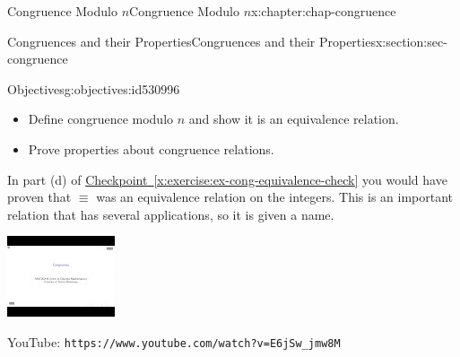 \documentclass[oneside,10pt,]{book}
\newcommand{\xreffont}{\relax}
\newcommand{\mono}[1]{\texttt{#1}}
\numberwithin{equation}{section}
\newlength{\qrsize}
\newlength{\previewwidth}
\begin{document}
\begin{chapterptx}{Congruence Modulo \(n\)}{}{Congruence Modulo \(n\)}{}{}{x:chapter:chap-congruence}
\begin{sectionptx}{Congruences and their Properties}{}{Congruences and their Properties}{}{}{x:section:sec-congruence}
\begin{objectives}{Objectives}{g:objectives:id530996}
%
\begin{itemize}[label=\textbullet]
\item{}Define congruence modulo \(n\) and show it is an equivalence relation.%
\item{}Prove properties about congruence relations.%
\end{itemize}
\end{objectives}
In part (d) of \hyperref[x:exercise:ex-cong-equivalence-check]{Checkpoint~{\xreffont\ref{x:exercise:ex-cong-equivalence-check}}} you would have proven that \(\equiv\) was an equivalence relation on the integers. This is an important relation that has several applications, so it is given a name.%
\begin{sidebyside}{1}{0}{0}{0}%
\begin{sbspanel}{1}%
\setlength{\qrsize}{9em}
\setlength{\previewwidth}{\linewidth}
\addtolength{\previewwidth}{-\qrsize}
\begin{tcbraster}[raster columns=2, raster column skip=1pt, raster halign=center, raster force size=false, raster left skip=0pt, raster right skip=0pt]%
\begin{tcolorbox}[previewstyle, width=\previewwidth]%
\includegraphics[width=0.80\linewidth,height=\qrsize,keepaspectratio]{images/video-congruence.jpg}%
\end{tcolorbox}%
\begin{tcolorbox}[qrstyle]%
{\hypersetup{urlcolor=black}}%
\end{tcolorbox}%
\begin{tcolorbox}[captionstyle]%
\small YouTube: \mono{https://www.youtube.com/watch?v=E6jSw\_jmw8M}\end{tcolorbox}%
\end{tcbraster}%

\end{sbspanel}
\end{sidebyside}
\end{sectionptx}
\end{chapterptx}
\end{document}
